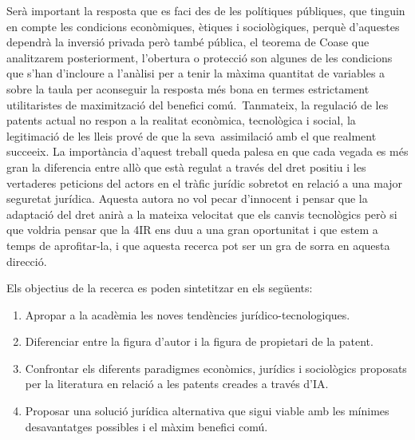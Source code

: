 \documentclass[12pt]{article}
\begin{document}
\vspace{\baselineskip}
\begin{justify}
Serà important la resposta que es faci des de les polítiques públiques, que tinguin en compte les condicions econòmiques, ètiques i sociològiques, perquè d’aquestes dependrà la inversió privada però també pública, el teorema de Coase que analitzarem posteriorment, l’obertura o protecció son algunes de les condicions que s’han d’incloure a l’anàlisi per a tenir la màxima quantitat de variables a sobre la taula per aconseguir la resposta més bona en termes estrictament utilitaristes de maximització del benefici comú.\  Tanmateix, la regulació de les patents actual no respon a la realitat econòmica, tecnològica i social, la legitimació de les lleis prové de que la seva\ assimilació amb el que realment succeeix.  La importància d’aquest treball queda palesa en que cada vegada es més gran la diferencia entre allò que està regulat a través del dret positiu i les vertaderes peticions del actors en el tràfic jurídic sobretot en relació a una major seguretat jurídica. Aquesta autora no vol pecar d’innocent i pensar que la adaptació del dret anirà a la mateixa velocitat que els canvis tecnològics però si que voldria pensar que la 4IR ens duu a una gran oportunitat i que estem a temps de aprofitar-la, i que aquesta recerca pot ser un gra de sorra en aquesta direcció. 
\end{justify}\par


\vspace{\baselineskip}
\begin{justify}
Els objectius de la recerca es poden sintetitzar en els següents:
\end{justify}\par


\vspace{\baselineskip}
\begin{enumerate}
	\item Apropar a la acadèmia les noves tendències jurídico-tecnologiques.\par

	\item Diferenciar entre la figura d’autor i la figura de propietari de la patent.\par

	\item Confrontar els diferents paradigmes econòmics, jurídics i sociològics  proposats per la literatura en relació a les patents creades a través d’IA.\par

	\item Proposar una solució jurídica alternativa que sigui viable amb les mínimes desavantatges possibles i el màxim benefici comú.
\end{enumerate}\par
\end{document}
